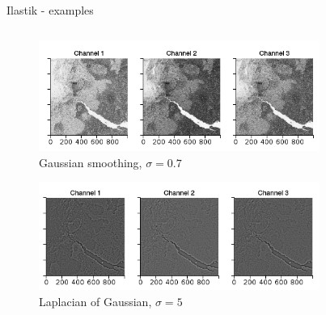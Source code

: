 \documentclass{beamer}
\begin{document}
\begin{frame}{Ilastik - examples}
\begin{columns}[T] %
\begin{column}{.8\textwidth}
\begin{figure}[!ht]
\centering
\includegraphics[width=.7\textwidth]{part3_sub1.png}
\caption{Gaussian smoothing, $\sigma=0.7$}
\label{}
\end{figure}
\begin{figure}[!ht]
\centering
\includegraphics[width=.7\textwidth]{part3_sub2.png}
\caption{Laplacian of Gaussian, $\sigma=5$}
\label{}
\end{figure}
\end{column}%
\begin{column}{.2\textwidth}
\begin{figure}[!ht]
\centering

\end{figure}
\end{column}
\end{columns}
\end{frame}
\end{document}
